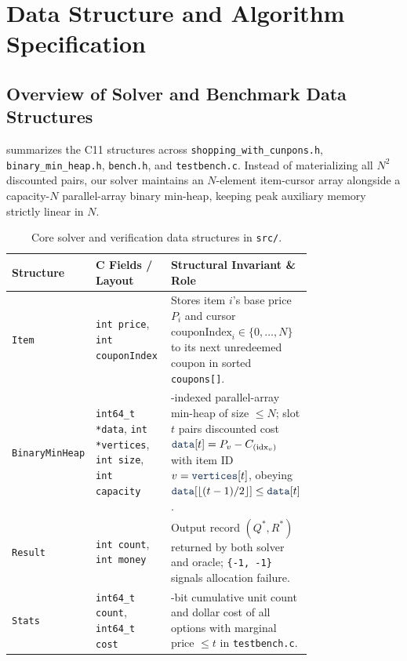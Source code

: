 \documentclass[10pt, a4paper]{article}
\newcommand{\code}[1]{\texttt{\color{primary!90!black}#1}}
\newcommand{\id}[1]{\ensuremath{\mathrm{#1}}}
\begin{document}
\clearpage

\section{Data Structure and Algorithm Specification}

\subsection{Overview of Solver and Benchmark Data Structures}
 summarizes the C11 structures across \code{shopping\_with\_cunpons.h}, \code{binary\_min\_heap.h}, \code{bench.h}, and \code{testbench.c}. Instead of materializing all $N^2$ discounted pairs, our solver maintains an $N$-element item-cursor array alongside a capacity-$N$ parallel-array binary min-heap, keeping peak auxiliary memory strictly linear in $N$.

\begin{table}[H]
\centering
\caption{Core solver and verification data structures in \code{src/}.}
\label{tab:structures}
\begin{tabular}{@{}l>{\raggedright\arraybackslash}p{0.34\linewidth}>{\raggedright\arraybackslash}p{0.42\linewidth}@{}}
\toprule
\textbf{\color{primary}Structure} & \textbf{\color{primary}C Fields / Layout} & \textbf{\color{primary}Structural Invariant \& Role} \\
\midrule
\code{Item} & \code{int price}, \code{int couponIndex} & Stores item $i$'s base price $P_i$ and cursor $\id{couponIndex}_i \in \{0, \ldots, N\}$ to its next unredeemed coupon in sorted \code{coupons[]}. \\
\code{BinaryMinHeap} & \code{int64\_t *data}, \code{int *vertices}, \code{int size}, \code{int capacity} & 0-indexed parallel-array min-heap of size $\le N$; slot $t$ pairs discounted cost $\code{data}[t] = P_v - C_{(\id{idx}_v)}$ with item ID $v = \code{vertices}[t]$, obeying $\code{data}[\lfloor(t-1)/2\rfloor] \le \code{data}[t]$. \\
\code{Result} & \code{int count}, \code{int money} & Output record $(Q^*, R^*)$ returned by both solver and oracle; \code{\{-1, -1\}} signals allocation failure. \\
\code{Stats} & \code{int64\_t count}, \code{int64\_t cost} & 64-bit cumulative unit count and dollar cost of all options with marginal price $\le t$ in \code{testbench.c}. \\
\bottomrule
\end{tabular}
\end{table}
\end{document}
